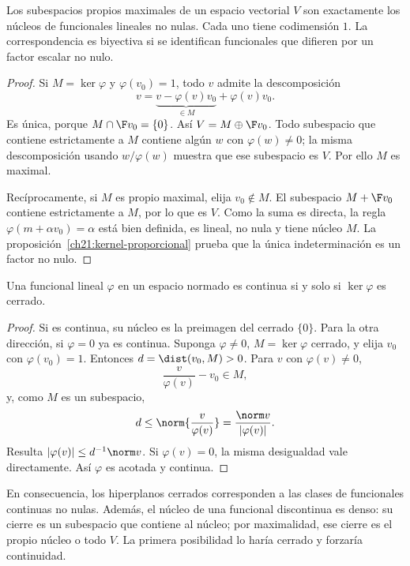 \begin{teorema}\label{ch21:hiperplanos}
Los subespacios propios maximales de un espacio vectorial $V$ son exactamente los núcleos de funcionales lineales no nulas. Cada uno tiene codimensión $1$. La correspondencia es biyectiva si se identifican funcionales que difieren por un factor escalar no nulo.
\end{teorema}
\begin{proof}
Si $M=\ker\varphi$ y $\varphi(v_0)=1$, todo $v$ admite la descomposición
\[
 v=\underbrace{v-\varphi(v)v_0}_{\in M}+\varphi(v)v_0.
\]
Es única, porque $M\cap\F v_0=\{0\}$. Así $V=M\oplus\F v_0$. Todo subespacio que contiene estrictamente a $M$ contiene algún $w$ con $\varphi(w)\ne0$; la misma descomposición usando $w/\varphi(w)$ muestra que ese subespacio es $V$. Por ello $M$ es maximal.

Recíprocamente, si $M$ es propio maximal, elija $v_0\notin M$. El subespacio $M+\F v_0$ contiene estrictamente a $M$, por lo que es $V$. Como la suma es directa, la regla $\varphi(m+\alpha v_0)=\alpha$ está bien definida, es lineal, no nula y tiene núcleo $M$. La proposición~\ref{ch21:kernel-proporcional} prueba que la única indeterminación es un factor no nulo.
\end{proof}

\begin{proposicion}\label{ch21:kernel-cerrado}
Una funcional lineal $\varphi$ en un espacio normado es continua si y solo si $\ker\varphi$ es cerrado.
\end{proposicion}
\begin{proof}
Si es continua, su núcleo es la preimagen del cerrado $\{0\}$. Para la otra dirección, si $\varphi=0$ ya es continua. Suponga $\varphi\ne0$, $M=\ker\varphi$ cerrado, y elija $v_0$ con $\varphi(v_0)=1$. Entonces $d=\dist(v_0,M)>0$. Para $v$ con $\varphi(v)\ne0$,
\[
 \frac{v}{\varphi(v)}-v_0\in M,
\]
y, como $M$ es un subespacio,
\[
 d\leq\norm{\frac v{\varphi(v)}}=\frac{\norm v}{|\varphi(v)|}.
\]
Resulta $|\varphi(v)|\leq d^{-1}\norm v$. Si $\varphi(v)=0$, la misma desigualdad vale directamente. Así $\varphi$ es acotada y continua.
\end{proof}

En consecuencia, los hiperplanos cerrados corresponden a las clases de funcionales continuas no nulas. Además, el núcleo de una funcional discontinua es denso: su cierre es un subespacio que contiene al núcleo; por maximalidad, ese cierre es el propio núcleo o todo $V$. La primera posibilidad lo haría cerrado y forzaría continuidad.

